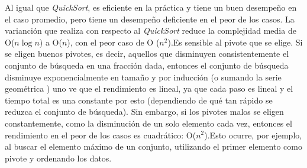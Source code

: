 Al igual que \emph{QuickSort}, es eficiente en la práctica y tiene un buen desempeño en el caso promedio, pero tiene un desempeño deficiente en el peor de los casos. La varianción que realiza con respecto al \emph{QuickSort} reduce la complejidad media de O($n\log n$) a  O($n$), con el peor caso de O ($n^{2}$).Es sensible al pivote que se elige. Si se eligen buenos pivotes, es decir, aquellos que disminuyen consistentemente el conjunto de búsqueda en una fracción dada, entonces el conjunto de búsqueda disminuye exponencialmente en tamaño y por inducción (o sumando la serie geométrica ) uno ve que el rendimiento es lineal, ya que cada paso es lineal y el tiempo total es una constante por esto (dependiendo de qué tan rápido se reduzca el conjunto de búsqueda). Sin embargo, si los pivotes malos se eligen constantemente, como la disminución de un solo elemento cada vez, entonces el rendimiento en el peor de los casos es cuadrático: O($n^{2}$).Esto ocurre, por ejemplo, al buscar el elemento máximo de un conjunto, utilizando el primer elemento como pivote y ordenando los datos. 